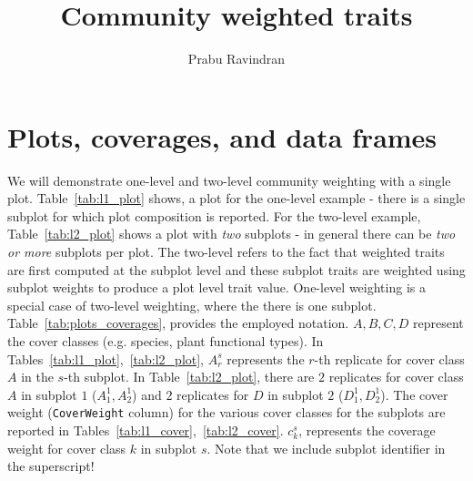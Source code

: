 \documentclass[12pt]{article}
\title{Community weighted traits}
\author{Prabu Ravindran}
\date{}
\begin{document}
	\maketitle
	
	\section*{Plots, coverages, and data frames}
	We will demonstrate one-level and two-level community weighting with a single plot. Table~\ref{tab:l1_plot} shows, a plot for the one-level example - there is a single subplot for which plot composition is reported. For the two-level example, Table~\ref{tab:l2_plot} shows a plot with \textit{two} subplots - in general there can be \textit{two or more} subplots per plot. The two-level refers to the fact that weighted traits are first computed at the subplot level and these subplot traits are weighted using subplot weights to produce a plot level trait value. One-level weighting is a special case of two-level weighting, where the there is one subplot. Table~\ref{tab:plots_coverages}, provides the employed notation. $A, B, C, D$ represent the cover classes (e.g. species, plant functional types). In Tables~\ref{tab:l1_plot},~\ref{tab:l2_plot}, $A_{r}^{s}$ represents the $r$-th replicate for cover class $A$ in the $s$-th subplot. In Table~\ref{tab:l2_plot}, there are $2$ replicates for cover class $A$ in subplot $1$ ($A_{1}^1, A_{2}^1$) and $2$ replicates for $D$ in subplot $2$ ($D_{1}^1, D_{2}^1$). The cover weight (\texttt{CoverWeight} column) for the various cover classes for the subplots are reported in Tables~\ref{tab:l1_cover},~\ref{tab:l2_cover}. $c_{k}^{s}$, represents the coverage weight for cover class $k$ in subplot $s$. Note that we include subplot identifier in the superscript! 
			
\end{document}
